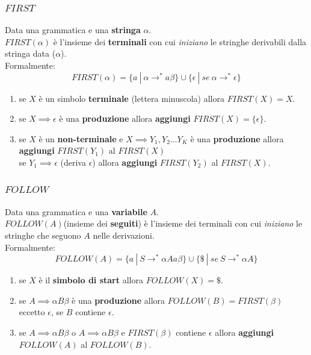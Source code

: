\documentclass[12pt]{article}
\begin{document}
\subsubsection{$FIRST$}
Data una grammatica e una \textbf{stringa} $\alpha$.\\
$FIRST(\alpha)$ è l'insieme dei \textbf{terminali} con cui \textit{iniziano} le stringhe derivabili dalla stringa data ($\alpha$).\\
Formalmente:
\begin{equation*}
    FIRST(\alpha) = \{a\ |\ \alpha \rightarrow^*a\beta\} \cup \{\epsilon\ |\ se\  \alpha \rightarrow^*\epsilon\}
\end{equation*}
\begin{enumerate}
    \item se $X$ è un simbolo \textbf{terminale} (lettera minuscola) allora $FIRST(X)=X$.
    \item se $X \implies \epsilon$ è una \textbf{produzione} allora \textbf{aggiungi} $FIRST(X)=\{\epsilon\}$.
    \item se $X$ è un \textbf{non-terminale} e $X \implies Y_1,Y_2\dots Y_K$ è una \textbf{produzione} allora \textbf{aggiungi} $FIRST(Y_1)$ al $FIRST(X)$\\
            se $Y_1 \implies \epsilon$ (deriva $\epsilon$) allora \textbf{aggiungi} $FIRST(Y_2)$ al $FIRST(X)$.
\end{enumerate}

\subsubsection{$FOLLOW$}
Data una grammatica e una \textbf{variabile} $A$.\\
$FOLLOW(A)$(insieme dei \textbf{seguiti}) è l'insieme dei terminali con cui \textit{iniziano} le stringhe che seguono $A$ nelle derivazioni.\\
Formalmente:
\begin{equation*}
    FOLLOW(A)=\{a\ |\ S \rightarrow^* \alpha Aa\beta\} \cup \{\$\ |\ se\ S \rightarrow^*\alpha A\}
\end{equation*}
\begin{enumerate}
    \item se $X$ è il \textbf{simbolo di start} allora $FOLLOW(X)=\$$.
    \item se $A \implies \alpha B \beta$ è una \textbf{produzione} allora $FOLLOW(B)=FIRST(\beta)$ eccetto $\epsilon$, se $B$ contiene $\epsilon$.
    \item se $A \implies \alpha B \beta$ o $A \implies \alpha B \beta$ e $FIRST(\beta)$ contiene $\epsilon$ allora \textbf{aggiungi} $FOLLOW(A)$ al $FOLLOW(B)$.
\end{enumerate}
\end{document}
